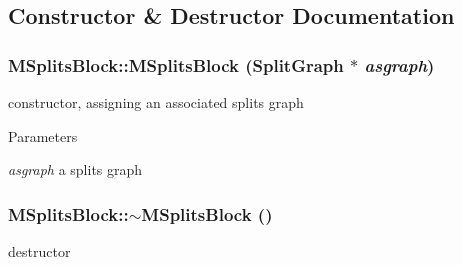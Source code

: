 \subsection{Constructor \& Destructor Documentation}
\hypertarget{classMSplitsBlock_a17ec9ef3354fde89163fd1ee6c22d5d6}{
\subsubsection[{MSplitsBlock}]{\setlength{\rightskip}{0pt plus 5cm}MSplitsBlock::MSplitsBlock ({\bf SplitGraph} $\ast$ {\em asgraph})}}
\label{classMSplitsBlock_a17ec9ef3354fde89163fd1ee6c22d5d6}
constructor, assigning an associated splits graph 
\begin{DoxyParams}{Parameters}
\item[{\em asgraph}]a splits graph \end{DoxyParams}
\hypertarget{classMSplitsBlock_a214ec1c6f4a93bafc034d58794e0ca52}{
\subsubsection[{$\sim$MSplitsBlock}]{\setlength{\rightskip}{0pt plus 5cm}MSplitsBlock::$\sim$MSplitsBlock ()}}
\label{classMSplitsBlock_a214ec1c6f4a93bafc034d58794e0ca52}
destructor 

